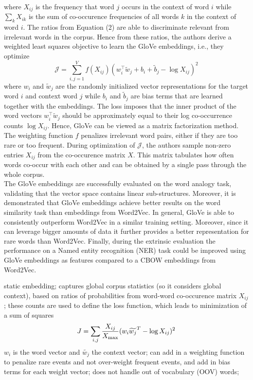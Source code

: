 \documentclass[11pt, a4paper]{amsart}
\begin{document}
where $X_{ij}$ is the frequency that word $j$ occurs in the context of word $i$ while $\sum_{k} X_{ik}$ is the sum of co-occurence frequencies of all words $k$ in the context of word $i$.
The ratios from Equation (2) are able to discriminate relevant from irrelevant words in the corpus. Hence from these ratios, the authors derive a weighted least squares objective to learn the GloVe embeddings, i.e., they optimize
\begin{equation}
	\mathcal{J} = \sum_{i,j = 1}^V f(X_{ij})(w_i^\top\widetilde{w}_j + b_i + \widetilde{b}_j - \log X_{ij})^2
\end{equation}
where $w_i$ and $\widetilde{w}_j$ are the randomly initialized vector representations for the target word $i$ and context word $j$ while $b_i$ and $\tilde{b}_j$ are bias terms that are learned together with the embeddings. The loss imposes that the inner product of the word vectors $w_i^\top\widetilde{w}_j$ should be approximately equal to their log co-occurrence counts $\log X_{ij}$. Hence, GloVe can be viewed as a matrix factorization method. The weighting function $f$ penalizes irrelevant word pairs, either if they are too rare or too frequent. During optimization of $\mathcal{J}$, the authors sample non-zero entries $X_{ij}$ from the co-occurence matrix $X$. This matrix tabulates how often words co-occur with each other and can be obtained by a single pass through the whole corpus.\\

The GloVe embeddings are successfully evaluated on the word analogy task, validating that the vector space contains linear sub-structures. Moreover, it is demonstrated that GloVe embeddings achieve better results on the word similarity task than embeddings from Word2Vec. In general, GloVe is able to consistently outperform Word2Vec in a similar training setting. Moreover, since it can leverage bigger amounts of data it further provides a better representation for rare words than Word2Vec. Finally, during the extrinsic evaluation the performance on a Named entity recognition (NER) task could be improved using GloVe embeddings as features compared to a CBOW embeddings from Word2Vec.

{
\color{blue}
	
static embedding;
captures global corpus statistics (so it considers global context), based on ratios of probabilities from word-word co-occurence matrix $X_{ij}$;
these counts are used to define the loss function, which leads to minimization of a sum of squares
\begin{equation*}
    J = \sum_{i, j} \frac{X_{ij}}{X_{\textup{max}}}
    (w_{i} \widetilde{w_{j}}^{T} - \log X_{ij})^{2}
\end{equation*}
$w_{i}$ is the word vector and $\widetilde{w_{j}}$ the context vector;
can add in a weighting function to penalize rare events and not over-weight frequent events, and add in bias terms for each weight vector;
does not handle out of vocabulary (OOV) words;
}
\end{document}
